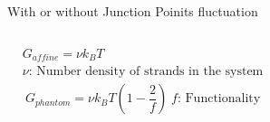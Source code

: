 \documentclass[aspectratio=169,11pt, dvipdfmx]{beamer}
\begin{document}
\begin{frame}
		\begin{block}{With or without Junction Poinits fluctuation}
			\vspace{1mm}
			\begin{columns}[T, onlytextwidth]
				\small
				\vspace{-2mm}
				\scriptsize
				\begin{align*}
					&G_{affine} = \nu k_B T  \\
					&\text{$\nu$: Number density of strands in the system}
				\end{align*}
				\small
				\vspace{-2mm}
				\scriptsize
				\begin{align*}
					&G_{phantom} = \nu k_B T \left(1 - \dfrac{2}{f}\right) \; \text{$f$: Functionality}
				\end{align*}
				\normalsize
			\end{columns}
		\end{block}
\end{frame}
\end{document}
